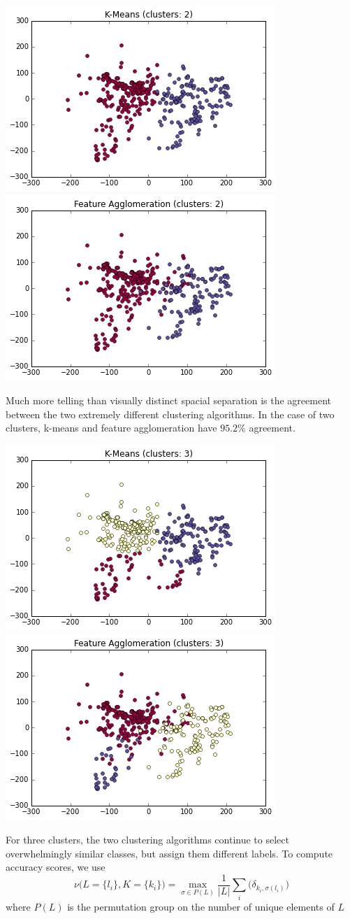 \documentclass[paper.tex]{subfiles}
\begin{document}
	\includegraphics[width=0.5\linewidth]{images/clusters_km_2.png}
	\includegraphics[width=0.5\linewidth]{images/clusters_fa_2.png}
	
	Much more telling than visually distinct spacial separation is the agreement between the two extremely different clustering algorithms. In the case of two clusters, k-means and feature agglomeration have $95.2\%$ agreement.

	\includegraphics[width=0.5\linewidth]{images/clusters_km_3.png}
	\includegraphics[width=0.5\linewidth]{images/clusters_fa_3.png}
	
	For three clusters, the two clustering algorithms continue to select overwhelmingly similar classes, but assign them different labels. To compute accuracy scores, we use 
	\[ \nu\Big(L = \{l_i\}, K = \{k_i\} \Big) =  \max_{\sigma \in P(L)} \frac{1}{|L|} \sum_i  \Big(\delta_{k_i, \sigma(l_i)} \Big) \]
	where $P(L)$ is the permutation group on the number of unique elements of $L$ 
	
\end{document}
